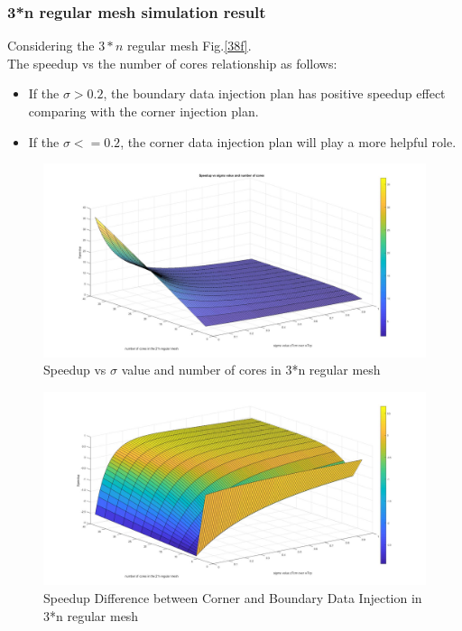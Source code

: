 \vspace*{50pt}

\subsubsection{3*n regular mesh simulation result}

Considering the $3*n $ regular mesh Fig.\ref{38f}.\\

The speedup vs the number of cores relationship as follows:

\begin{itemize}
\item If the $\sigma > 0.2$, the boundary data injection plan has positive speedup effect comparing with the corner injection plan. 
\item If the $\sigma <= 0.2$, the corner data injection plan will play a more helpful role.
\end{itemize}

\begin{figure}[h]
\centering\includegraphics[width=0.85\linewidth]{figure/nocorner3n}
\caption{Speedup vs $\sigma$ value and number of cores in 3*n regular mesh}
\label{nocorner3n}
\end{figure}

\begin{figure}[h]
\centering\includegraphics[width=0.85\linewidth]{figure/nobc3n}
\caption{Speedup Difference between Corner and Boundary Data Injection in 3*n regular mesh}
\label{nobc3n}
\end{figure}


